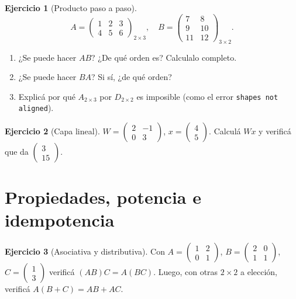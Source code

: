 \documentclass[a4paper,12pt]{article}
\theoremstyle{definition}
\newtheorem{ejercicio}{Ejercicio}[section]
\begin{document}
\begin{ejercicio}[Producto paso a paso]
\[
A = \begin{pmatrix} 1 & 2 & 3 \\ 4 & 5 & 6 \end{pmatrix}_{2 \times 3}, \quad
B = \begin{pmatrix} 7 & 8 \\ 9 & 10 \\ 11 & 12 \end{pmatrix}_{3 \times 2}.
\]
\begin{enumerate}[label=\alph*)]
\item ¿Se puede hacer $AB$? ¿De qué orden es? Calculalo completo.
\item ¿Se puede hacer $BA$? Si sí, ¿de qué orden?
\item Explicá por qué $A_{2 \times 3}$ por $D_{2 \times 2}$ es imposible (como el error \texttt{shapes not aligned}).
\end{enumerate}
\end{ejercicio}

\begin{ejercicio}[Capa lineal]
$W = \begin{pmatrix} 2 & -1 \\ 0 & 3 \end{pmatrix}$, $x = \begin{pmatrix} 4 \\ 5 \end{pmatrix}$. Calculá $Wx$ y verificá que da $\begin{pmatrix} 3 \\ 15 \end{pmatrix}$.
\end{ejercicio}

\section{Propiedades, potencia e idempotencia}
\begin{ejercicio}[Asociativa y distributiva]
Con $A=\begin{pmatrix} 1 & 2 \\ 0 & 1 \end{pmatrix}$, $B=\begin{pmatrix} 2 & 0 \\ 1 & 1 \end{pmatrix}$, $C=\begin{pmatrix} 1 \\ 3 \end{pmatrix}$ verificá $(AB)C = A(BC)$. Luego, con otras $2 \times 2$ a elección, verificá $A(B+C)=AB+AC$.
\end{ejercicio}
\end{document}
